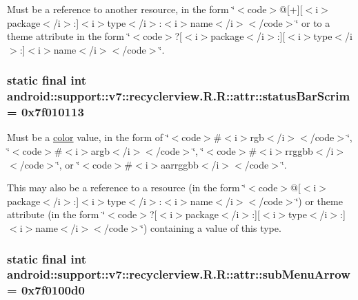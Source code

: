 Must be a reference to another resource, in the form \char`\"{}$<$code$>$@\mbox{[}+\mbox{]}\mbox{[}$<$i$>$package$<$/i$>$:\mbox{]}$<$i$>$type$<$/i$>$:$<$i$>$name$<$/i$>$$<$/code$>$\char`\"{} or to a theme attribute in the form \char`\"{}$<$code$>$?\mbox{[}$<$i$>$package$<$/i$>$:\mbox{]}\mbox{[}$<$i$>$type$<$/i$>$:\mbox{]}$<$i$>$name$<$/i$>$$<$/code$>$\char`\"{}. \hypertarget{classandroid_1_1support_1_1v7_1_1recyclerview_1_1_r_1_1attr_2ebfa9b2582fc7669e07b43ca7f8f7c1}{
\subsubsection[{statusBarScrim}]{\setlength{\rightskip}{0pt plus 5cm}static final int android::support::v7::recyclerview.R.R::attr::statusBarScrim = 0x7f010113}}
\label{classandroid_1_1support_1_1v7_1_1recyclerview_1_1_r_1_1attr_2ebfa9b2582fc7669e07b43ca7f8f7c1}


Must be a \hyperlink{classandroid_1_1support_1_1v7_1_1recyclerview_1_1_r_1_1color}{color} value, in the form of \char`\"{}$<$code$>$\#$<$i$>$rgb$<$/i$>$$<$/code$>$\char`\"{}, \char`\"{}$<$code$>$\#$<$i$>$argb$<$/i$>$$<$/code$>$\char`\"{}, \char`\"{}$<$code$>$\#$<$i$>$rrggbb$<$/i$>$$<$/code$>$\char`\"{}, or \char`\"{}$<$code$>$\#$<$i$>$aarrggbb$<$/i$>$$<$/code$>$\char`\"{}. 

This may also be a reference to a resource (in the form \char`\"{}$<$code$>$@\mbox{[}$<$i$>$package$<$/i$>$:\mbox{]}$<$i$>$type$<$/i$>$:$<$i$>$name$<$/i$>$$<$/code$>$\char`\"{}) or theme attribute (in the form \char`\"{}$<$code$>$?\mbox{[}$<$i$>$package$<$/i$>$:\mbox{]}\mbox{[}$<$i$>$type$<$/i$>$:\mbox{]}$<$i$>$name$<$/i$>$$<$/code$>$\char`\"{}) containing a value of this type. \hypertarget{classandroid_1_1support_1_1v7_1_1recyclerview_1_1_r_1_1attr_969ec37bdbc88cf6616a03b973c7d2cf}{
\subsubsection[{subMenuArrow}]{\setlength{\rightskip}{0pt plus 5cm}static final int android::support::v7::recyclerview.R.R::attr::subMenuArrow = 0x7f0100d0}}
\label{classandroid_1_1support_1_1v7_1_1recyclerview_1_1_r_1_1attr_969ec37bdbc88cf6616a03b973c7d2cf}


